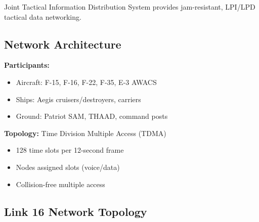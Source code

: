 Joint Tactical Information Distribution System provides jam-resistant, LPI/LPD tactical data networking.

\subsection{Network Architecture}

\textbf{Participants:}
\begin{itemize}
\item Aircraft: F-15, F-16, F-22, F-35, E-3 AWACS
\item Ships: Aegis cruisers/destroyers, carriers
\item Ground: Patriot SAM, THAAD, command posts
\end{itemize}

\textbf{Topology:} Time Division Multiple Access (TDMA)
\begin{itemize}
\item 128 time slots per 12-second frame
\item Nodes assigned slots (voice/data)
\item Collision-free multiple access
\end{itemize}

\subsection{Link 16 Network Topology}


